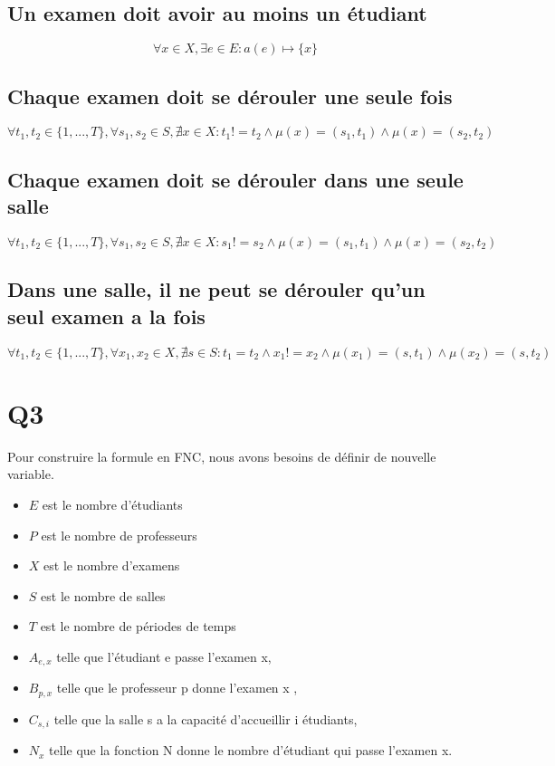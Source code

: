 \documentclass[a4paper,11pt]{article}
\begin{document}
\subsection {Un examen doit avoir au moins un étudiant}
\begin{displaymath}
\forall x \in X, \exists e \in E : a(e) \mapsto \{x\}
\end{displaymath}
\subsection {Chaque examen doit se dérouler une seule fois}
\begin{displaymath}
\forall t_{1}, t_{2} \in \{1,...,T\},\forall s_{1},s_{2} \in S, \nexists x \in X : t_{1} != t_{2} \wedge \mu(x) = (s_{1},t_{1}) \wedge \mu(x) = (s_{2},t_{2})
\end{displaymath}
\subsection {Chaque examen doit se dérouler dans une seule salle}
\begin{displaymath}
\forall t_{1}, t_{2} \in \{1,...,T\},\forall s_{1},s_{2} \in S, \nexists x \in X : s_{1} != s_{2} \wedge \mu(x) = (s_{1},t_{1}) \wedge \mu(x) = (s_{2},t_{2})
\end{displaymath}	
\subsection {Dans une salle, il ne peut se dérouler qu'un seul examen a la fois}
\begin{displaymath}
\forall t_{1}, t_{2} \in \{1,...,T\},\forall x_{1},x_{2} \in X, \nexists s \in S : t_{1} = t_{2} \wedge x_{1} != x_{2} \wedge \mu(x_{1}) = (s,t_{1}) \wedge \mu(x_{2}) = (s,t_{2})
\end{displaymath}	

\section{Q3}
Pour construire la formule en FNC, nous avons besoins de définir de nouvelle variable.
\begin{itemize}
    \item \(E\) est le nombre d'étudiants
    \item \(P\) est le nombre de professeurs
    \item \(X\) est le nombre d'examens
    \item \(S\) est le nombre de salles
    \item \(T\) est le nombre de périodes de temps
	\item \( A_{e,x}\) telle que l'étudiant e passe l'examen x,
	\item \(B_{p,x}\) telle que le professeur p donne l'examen x ,
	\item \(C_{s,i}\) telle que la salle s a la capacité d'accueillir i étudiants,
	\item \(N_{x}\) telle que la fonction N donne le nombre d'étudiant qui passe l'examen x.
\end{itemize}
\end{document}
